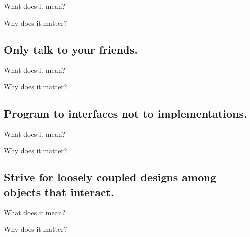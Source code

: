 \documentclass{beamer}
\begin{document}
\begin{frame}{What does it mean?}
\end{frame}

\begin{frame}{Why does it matter?}
\end{frame}

\subsection{Only talk to your friends.}

\begin{frame}{What does it mean?}
\end{frame}

\begin{frame}{Why does it matter?}
\end{frame}

\subsection{Program to interfaces not to implementations.}

\begin{frame}{What does it mean?}
\end{frame}

\begin{frame}{Why does it matter?}
\end{frame}

\subsection{Strive for loosely coupled designs among objects that interact.}

\begin{frame}{What does it mean?}
\end{frame}

\begin{frame}{Why does it matter?}
\end{frame}
\end{document}
